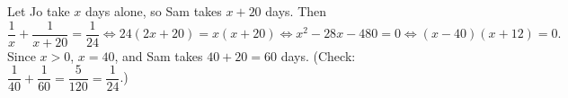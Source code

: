 Let Jo take $x$ days alone, so Sam takes $x+20$ days. Then
\[\dfrac1x+\dfrac1{x+20}=\dfrac1{24}\iff24(2x+20)=x(x+20)\iff x^2-28x-480=0\iff(x-40)(x+12)=0.\]
Since $x>0$, $x=40$, and Sam takes $40+20=\boxed{60}$ days. (Check: $\dfrac1{40}+\dfrac1{60}=\dfrac{5}{120}=\dfrac1{24}$.)
